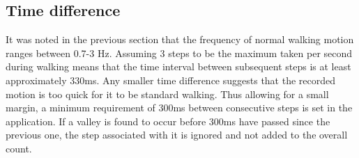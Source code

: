 \documentclass[12pt,a4paper,notitlepage]{report}
\begin{document}
\subsection*{Time difference}

It was noted in the previous section that the frequency of normal walking motion ranges between 0.7-3 Hz. Assuming 3 steps to be the maximum taken per second during walking means that the time interval between subsequent steps is at least approximately 330ms. Any smaller time difference suggests that the recorded motion is too quick for it to be standard walking. Thus allowing for a small margin, a minimum requirement of 300ms between consecutive steps is set in the application. If a valley is found to occur before 300ms have passed since the previous one, the step associated with it is ignored and not added to the overall count.

\nocite{*}



\end{document}
